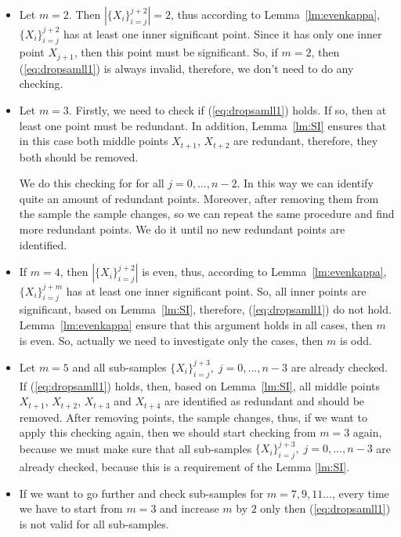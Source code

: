 \documentclass[12pt, a4paper]{article}
\numberwithin{equation}{section}
\begin{document}
\begin{itemize}

\item 
Let $m=2$. Then $|\{X_{i}\}_{i=j}^{j+2}|=2$, thus according to
Lemma~\ref{lm:evenkappa}, $\{X_{i}\}_{i=j}^{j+2}$ has at least one
inner significant point. 
Since it has only one inner point $X_{j+1}$, then 
this point must be significant. 
So, if $m=2$, then  (\ref{eq:dropsamll1}) is always invalid,
therefore, we don't need to do any checking.

\item 
Let $m=3$. Firstly, we need to check if (\ref{eq:dropsamll1}) holds.
If so,
then at least one 
point must be redundant.
In addition, Lemma~\ref{lm:SI} ensures that in this case
both middle points $X_{t+1}$, $X_{t+2}$ 
are redundant, therefore, they both should be removed. 

We do this checking for  for all
$j=0,...,n-2$. In this way
we can identify quite an amount of redundant
points. Moreover, after removing them from the sample the 
sample changes, so we can repeat the same procedure
and find more redundant points. We do it until
no new redundant points are 
identified.

\item 
If $m=4$, then $|\{X_{i}\}_{i=j}^{j+2}|$ is even, 
thus, according to Lemma~\ref{lm:evenkappa}, 
$\{X_{i}\}_{i=j}^{j+m}$ has at least one
inner significant point. So, all inner points are significant, 
based on Lemma~\ref{lm:SI}, therefore, 
(\ref{eq:dropsamll1}) do not hold.
Lemma~\ref{lm:evenkappa} ensure
that this argument holds in all cases, then $m$ is even.
So, actually we need to investigate only the cases, then 
$m$ is odd. 

\item 
Let 
$m=5$ and all sub-samples
 $\{X_{i}\}_{i=j}^{j+3},\;j=0,...,n-3$ are already 
 checked.
If (\ref{eq:dropsamll1}) holds, then, based on
Lemma~\ref{lm:SI}, all middle points
$X_{t+1}$, $X_{t+2}$, $X_{t+3}$  and $X_{t+4}$ are  
identified as redundant and should be removed.
After removing points, the sample changes, thus,
if we want to apply this checking again,
then we should start checking from $m=3$ again, because
we must make sure that all sub-samples
$\{X_{i}\}_{i=j}^{j+3},\;j=0,...,n-3$ are already 
checked, because this is a requirement of the Lemma \ref{lm:SI}.

\item If we want to go further and check
sub-samples for $m=7,9,11\dots$, every time we have to
start from $m=3$ and increase $m$ by $2$ only then
(\ref{eq:dropsamll1}) is not valid for
all sub-samples.

\end{itemize}
\end{document}
